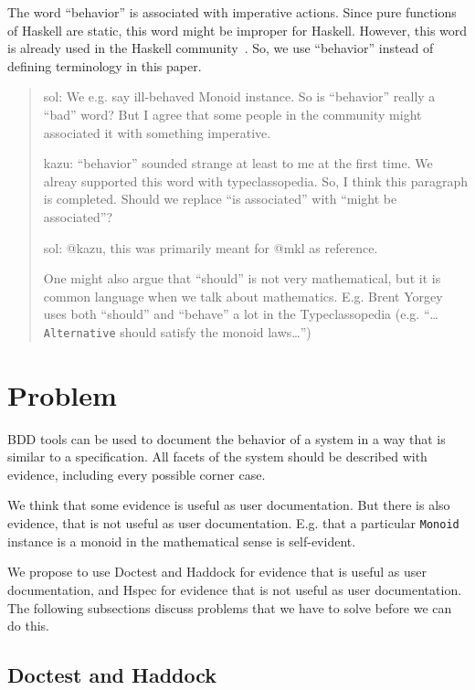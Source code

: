 \documentclass[preprint]{sigplanconf}
\begin{document}
The word ``behavior'' is associated with imperative actions.  Since
pure functions of Haskell are static, this word might be improper for
Haskell.  However, this word is already used in the Haskell
community~\cite{typeclassopedia}.  So, we use ``behavior'' instead of
defining terminology in this paper.

\begin{quote}
    sol: We e.g. say ill-behaved Monoid instance.  So is
    ``behavior'' really a ``bad'' word?  But I agree that some people in
    the community might associated it with something imperative.

    kazu: ``behavior'' sounded strange at least to me at the first time.
    We alreay supported this word with typeclassopedia. So, I think
    this paragraph is completed. Should we replace ``is associated'' with
    ``might be associated''?

    sol: @kazu, this was primarily meant for @mkl as reference.

    One might also argue that ``should'' is not very mathematical, but
    it is common language when we talk about mathematics.  E.g. Brent
    Yorgey uses both ``should'' and ``behave'' a lot in the
    Typeclassopedia (e.g. ``\ldots {\tt Alternative} should satisfy
    the monoid laws\ldots'')
\end{quote}

\section{Problem}
\label{sec:problem}

BDD tools can be used to document the behavior of a system in a way that
is similar to a specification.  All facets of the system should be
described with evidence, including every possible corner case.

We think that some evidence is useful as user documentation.
But there is also evidence, that is not
useful as user documentation.  E.g. that a particular \texttt{Monoid}
instance is a monoid in the mathematical sense is self-evident.

We propose to use Doctest and Haddock for evidence that is useful as
user documentation, and Hspec for evidence that is not useful as user
documentation.  The following subsections discuss problems that we
have to solve before we can do this.

\subsection{Doctest and Haddock}
\label{sec:doctest-haddock}
\end{document}
